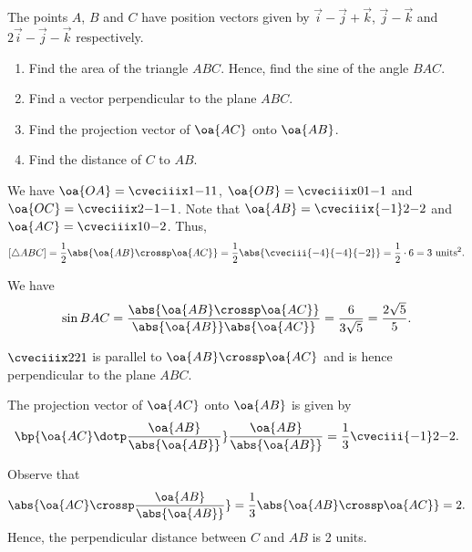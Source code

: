 \clearpage
\begin{problem}
    The points $A$, $B$ and $C$ have position vectors given by $\vec i - \vec j + \vec k$, $\vec j - \vec k$ and $2 \vec i - \vec j - \vec k$ respectively.

    \begin{enumerate}
        \item Find the area of the triangle $ABC$. Hence, find the sine of the angle $BAC$.
        \item Find a vector perpendicular to the plane $ABC$.
        \item Find the projection vector of $\oa{AC}$ onto $\oa{AB}$.
        \item Find the distance of $C$ to $AB$.
    \end{enumerate}
\end{problem}
\begin{solution}
    \begin{ppart}
        We have $\oa{OA} = \cveciiix1{-1}{1}$, $\oa{OB} = \cveciiix01{-1}$ and $\oa{OC} = \cveciiix2{-1}{-1}$. Note that $\oa{AB} = \cveciiix{-1}2{-2}$ and $\oa{AC} = \cveciiix10{-2}$. Thus, \[[\triangle ABC] = \frac12 \abs{\oa{AB} \crossp \oa{AC}} = \frac12 \abs{\cveciii{-4}{-4}{-2}} = \frac12 \cdot 6 = 3 \text{ units$^2$}.\]

        We have \[\sin BAC = \frac{\abs{\oa{AB} \crossp \oa{AC}}}{\abs{\oa{AB}}\abs{\oa{AC}}} = \frac{6}{3\sqrt5} = \frac{2\sqrt5}{5}.\]
    \end{ppart}
    \begin{ppart}
        $\cveciiix221$ is parallel to $\oa{AB} \crossp \oa{AC}$ and is hence perpendicular to the plane $ABC$.
    \end{ppart}
    \begin{ppart}
        The projection vector of $\oa{AC}$ onto $\oa{AB}$ is given by \[\bp{\oa{AC} \dotp \frac{\oa{AB}}{\abs{\oa{AB}}}} \frac{\oa{AB}}{\abs{\oa{AB}}} = \frac13 \cveciii{-1}2{-2}.\]
    \end{ppart}
    \begin{ppart}
        Observe that \[\abs{\oa{AC} \crossp \frac{\oa{AB}}{\abs{\oa{AB}}}} = \frac13 \abs{\oa{AB} \crossp \oa{AC}} = 2.\] Hence, the perpendicular distance between $C$ and $AB$ is 2 units.
    \end{ppart}
\end{solution}

